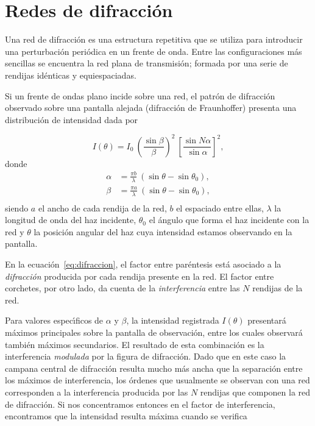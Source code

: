 \documentclass[epj]{svjour}
\begin{document}
\maketitle

\section{Redes de difracci\'on}

Una red de difracci\'on es una estructura repetitiva que se utiliza para
introducir una perturbaci\'on peri\'odica en un frente de onda. Entre las
configuraciones m\'as sencillas se encuentra la red plana de transmisi\'on;
formada por una serie de rendijas id\'enticas y equiespaciadas. 

Si un frente de ondas plano incide sobre una red, el patr\'on de difracci\'on
observado sobre una pantalla alejada (difracci\'on de Fraunhoffer) presenta
una distribuci\'on de intensidad dada por

\begin{equation}
    I(\theta) = I_0 \: \left( \frac{\sin \beta}{\beta} \right)^2 \: 
    \left[ \frac{\sin N\alpha}{\sin \alpha}\right]^2,
    \label{eq:difraccion}
\end{equation}
donde 
\begin{align*}
    \alpha &= \frac{\pi b}{\lambda} \: 
    \left(\sin \theta - \sin \theta_0 \right), \\
    \beta  &= \frac{\pi a}{\lambda} \: 
    \left(\sin \theta - \sin \theta_0 \right), \\
\end{align*}
siendo $a$ el ancho de cada rendija de la red, $b$ el espaciado entre ellas,
$\lambda$ la longitud de onda del haz incidente, 
$\theta_0$ el \'angulo que forma el haz incidente con la red y $\theta$ la
posici\'on angular del haz cuya intensidad estamos observando en la pantalla.

En la ecuaci\'on~\eqref{eq:difraccion}, el factor entre par\'entesis 
est\'a asociado a la {\it difracci\'on} producida por cada rendija
presente en la red. El factor entre corchetes, por otro lado, da cuenta de la 
{\it interferencia} entre las $N$ rendijas de la red. 

Para valores espec\'\i ficos de $\alpha$ y $\beta$, la intensidad registrada
$I(\theta)$ presentar\'a m\'aximos principales sobre la pantalla de 
observaci\'on, entre los cuales observar\'a tambi\'en m\'aximos secundarios.
El resultado de esta combinaci\'on es la interferencia {\it modulada} por
la figura de difracci\'on. Dado que en este caso la campana central de 
difracci\'on resulta mucho m\'as ancha que la separaci\'on entre los m\'aximos
de interferencia, los \'ordenes que usualmente se observan con una red 
corresponden a la interferencia producida por las $N$ rendijas que componen
la red de difracci\'on. Si nos concentramos entonces en el factor de 
interferencia, encontramos que la intensidad resulta m\'axima cuando se
verifica
\end{document}
